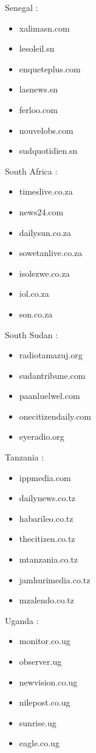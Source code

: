 \documentclass[
  letterpaper,
  DIV=11,
  numbers=noendperiod]{scrartcl}
\providecommand{\tightlist}{%
  \setlength{\itemsep}{0pt}\setlength{\parskip}{0pt}}\usepackage{longtable,booktabs,array}
\begin{document}
Senegal :

\begin{itemize}
\tightlist
\item
  xalimasn.com
\item
  lesoleil.sn
\item
  enqueteplus.com
\item
  lasnews.sn
\item
  ferloo.com
\item
  nouvelobs.com
\item
  sudquotidien.sn
\end{itemize}

South Africa :

\begin{itemize}
\tightlist
\item
  timeslive.co.za
\item
  news24.com
\item
  dailysun.co.za
\item
  sowetanlive.co.za
\item
  isolezwe.co.za
\item
  iol.co.za
\item
  son.co.za
\end{itemize}

South Sudan :

\begin{itemize}
\tightlist
\item
  radiotamazuj.org
\item
  sudantribune.com
\item
  paanluelwel.com
\item
  onecitizendaily.com
\item
  eyeradio.org
\end{itemize}

Tanzania :

\begin{itemize}
\tightlist
\item
  ippmedia.com
\item
  dailynews.co.tz
\item
  habarileo.co.tz
\item
  thecitizen.co.tz
\item
  mtanzania.co.tz
\item
  jamhurimedia.co.tz
\item
  mzalendo.co.tz
\end{itemize}

Uganda :

\begin{itemize}
\tightlist
\item
  monitor.co.ug
\item
  observer.ug
\item
  newvision.co.ug
\item
  nilepost.co.ug
\item
  sunrise.ug
\item
  eagle.co.ug
\end{itemize}
\end{document}
